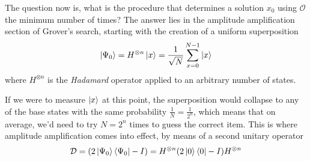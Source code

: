 \documentclass[../../dissertation.tex]{subfiles}
\begin{document}
The question now is, what is the procedure that determines a solution $x_0$ using $\mathcal{O}$ the minimum number of times? The answer lies in the amplitude amplification section of Grover's search, starting with the creation of a uniform superposition
\begin{equation}
	\ket{\Psi_0} = H^{\otimes n}\ket{x} = \frac{1}{\sqrt{N}}\sum_{x=0}^{N-1} \ket{x}
\end{equation}
where $H^{\otimes n}$ is the \textit{Hadamard} operator applied to an arbitrary number of states.\par
If we were to measure $\ket{x}$ at this point, the superposition would collapse to any of the base states with the same probability $\frac{1}{N} = \frac{1}{2^n}$, which means that on average, we'd need to try $N = 2^n$ times to guess the correct item. 
This is where amplitude amplification comes into effect, by means of a second unitary operator
\begin{equation}
	\mathcal{D} = (2\ket{\Psi_0}\bra{\Psi_0} - I) = H^{\otimes n}(2\ket{0}\bra{0} - I)H^{\otimes n}   
\end{equation}
\end{document}
